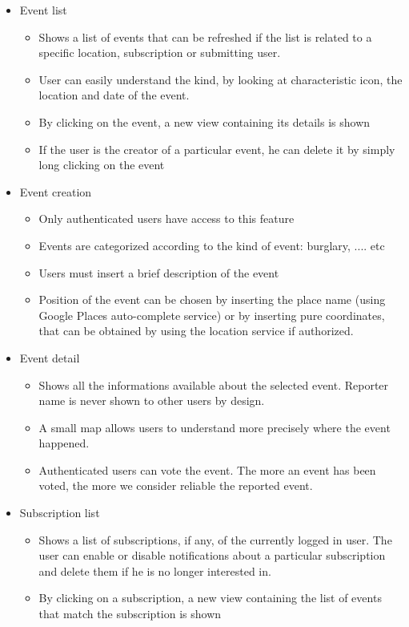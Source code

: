 \documentclass[a4paper]{scrreprt}
\begin{document}
\begin{itemize}
\item Event list
\begin{itemize}
\item Shows a list of events that can be refreshed if the list is related to a specific location, subscription or submitting user. 
\item User can easily understand the kind, by looking at characteristic icon, the location and date of the event.
\item By clicking on the event, a new view containing its details is shown
\item If the user is the creator of a particular event, he can delete it by simply long clicking on the event
\end{itemize}

\item Event creation
\begin{itemize}
\item Only authenticated users have access to this feature
\item Events are categorized according to the kind of event: burglary, .... etc
\item Users must insert a brief description of the event
\item Position of the event can be chosen by inserting the place name (using Google Places auto-complete service) or by inserting pure coordinates, that can be obtained by using the location service if authorized.
\end{itemize}

\item Event detail
\begin{itemize}
\item Shows all the informations available about the selected event. Reporter name is never shown to other users by design.
\item A small map allows users to understand more precisely where the event happened.
\item Authenticated users can vote the event. The more an event has been voted, the more we consider reliable the reported event.

\end{itemize}

\item Subscription list
\begin{itemize}
\item Shows a list of subscriptions, if any, of the currently logged in user. The user can enable or disable notifications about a particular subscription and delete them if he is no longer interested in.
\item By clicking on a subscription, a new view containing the list of events that match the subscription is shown
\end{itemize}


\end{itemize}
\end{document}
